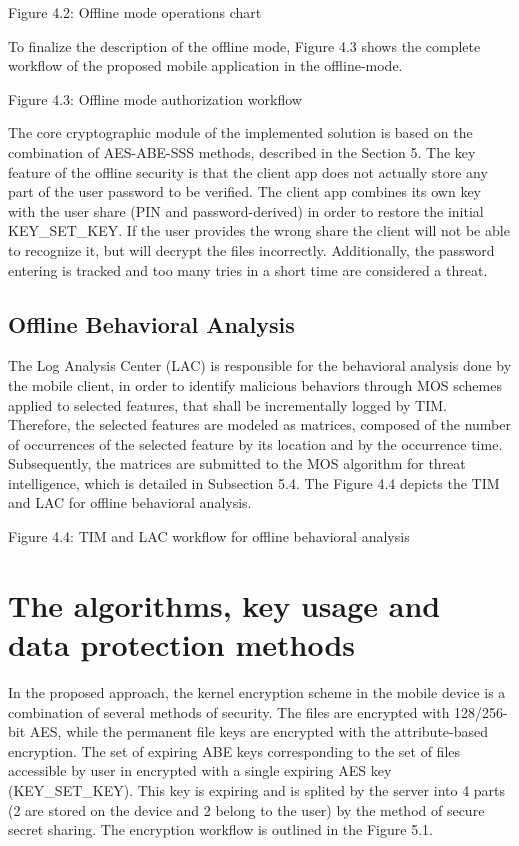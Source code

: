 \documentclass[twocolumn]{svjour3}          %
\begin{document}
Figure 4.2: Offline mode operations chart

To finalize the description of the offline mode, Figure 4.3 shows the complete workflow of the proposed mobile application in the offline-mode.

Figure 4.3: Offline mode authorization workflow

The core cryptographic module of the implemented solution is based on the combination of AES-ABE-SSS methods, described in the Section 5. The key feature of the offline security is that the client app does not actually store any part of the user password to be verified. The client app combines its own key with the user share (PIN and password-derived) in order to restore the initial KEY\_SET\_KEY. If the user provides the wrong share the client will not be able to recognize it, but will decrypt the files incorrectly. Additionally, the password entering is tracked and too many tries in a short time are considered a threat.

\subsection{Offline Behavioral Analysis}
\label{sec_offline_behavioral_analysis}
The Log Analysis Center (LAC) is responsible for the behavioral analysis done by the mobile client, in order to identify malicious behaviors through MOS schemes applied to selected features, that shall be incrementally logged by TIM. Therefore, the selected features are modeled as matrices, composed of the number of occurrences of the selected feature by its location and by the occurrence time. Subsequently, the matrices are submitted to the MOS algorithm for threat intelligence, which is detailed in Subsection 5.4. 
The Figure 4.4 depicts the TIM and LAC for offline behavioral analysis. 

Figure 4.4: TIM and LAC workflow for offline behavioral analysis

\section{The algorithms, key usage and data protection methods}
\label{sec_algorithms}
In the proposed approach, the kernel encryption scheme in the mobile device is a combination of several methods of security. The files are encrypted with 128/256-bit AES, while the permanent file keys are encrypted with the attribute-based encryption. The set of expiring ABE keys corresponding to the set of files accessible by user in encrypted with a single expiring AES key (KEY\_SET\_KEY). This key is expiring and is splited by the server into 4 parts (2 are stored on the device and 2 belong to the user) by the method of secure secret sharing. The encryption workflow is outlined in the Figure 5.1.
\end{document}
